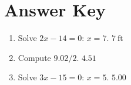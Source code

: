\documentclass[12pt]{article}
\begin{document}
\section*{Answer Key}
\begin{enumerate}
  \item Solve $2x - 14 = 0$: $x = 7$. \quad $\boxed{7\ \text{ft}}$
  \item Compute $9.02 / 2$. \quad $\boxed{4.51}$
  \item Solve $3x - 15 = 0$: $x = 5$. \quad $\boxed{5.00}$
\end{enumerate}
\end{document}
